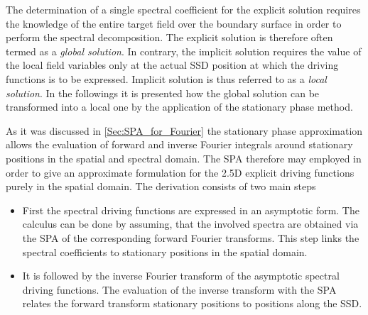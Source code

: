 The determination of a single spectral coefficient for the explicit solution requires the knowledge of the entire target field over the boundary surface in order to perform the spectral decomposition. 
The explicit solution is therefore often termed as a \emph{global solution}.
In contrary, the implicit solution requires the value of the local field variables only at the actual SSD position at which the driving functions is to be expressed.
Implicit solution is thus referred to as a \emph{local solution}.
In the followings it is presented how the global solution can be transformed into a local one by the application of the stationary phase method.

As it was discussed in \ref{Sec:SPA_for_Fourier} the stationary phase approximation allows the evaluation of forward and inverse Fourier integrals around stationary positions in the spatial and spectral domain.
The SPA therefore may employed in order to give an approximate formulation for the 2.5D explicit driving functions purely in the spatial domain.
The derivation consists of two main steps
\begin{itemize}
%
\item First the spectral driving functions are expressed in an asymptotic form. 
The calculus can be done by assuming, that the involved spectra are obtained via the SPA of the corresponding forward Fourier transforms. 
This step links the spectral coefficients to stationary positions in the spatial domain.
%
\item It is followed by the inverse Fourier transform of the asymptotic spectral driving functions.
The evaluation of the inverse transform with the SPA relates the forward transform stationary positions to positions along the SSD.
\end{itemize}

